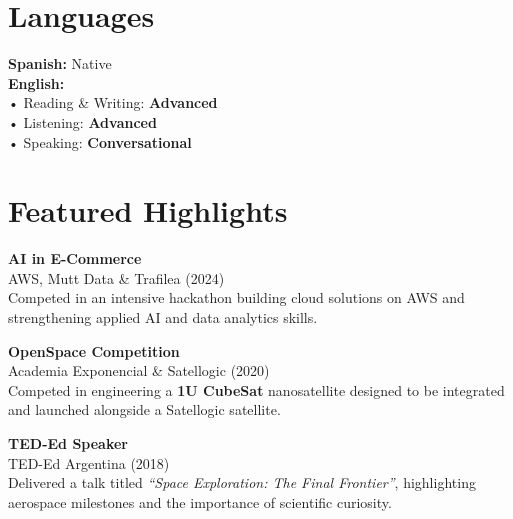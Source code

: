 \documentclass[10pt,a4paper]{article}
\newcommand{\sideitem}[3]{
  {\small\bfseries\color{darktext}#1}\\[1pt]
  {\footnotesize\color{primary}#2} {\footnotesize\color{mutedtext}(#3)}\\[1.5pt]
}
\begin{document}
\begin{minipage}[t]{6.3cm}
\section{Languages}
{\footnotesize\color{darktext}
\textbf{Spanish:} Native\\[2.5pt]
\textbf{English:}\\
\hspace*{0.3em}• Reading \& Writing: \textbf{Advanced}\\
\hspace*{0.3em}• Listening: \textbf{Advanced}\\
\hspace*{0.3em}• Speaking: \textbf{Conversational}
}

\section{Featured Highlights}

\sideitem{AI in E-Commerce}{AWS, Mutt Data \& Trafilea}{2024}
{\footnotesize\color{mutedtext}Competed in an intensive hackathon building cloud solutions on AWS and strengthening applied AI and data analytics skills.}\vspace{5pt}

\sideitem{OpenSpace Competition}{Academia Exponencial \& Satellogic}{2020}
{\footnotesize\color{mutedtext}Competed in engineering a \textbf{1U CubeSat} nanosatellite designed to be integrated and launched alongside a Satellogic satellite.}\vspace{5pt}

\sideitem{TED-Ed Speaker}{TED-Ed Argentina}{2018}
{\footnotesize\color{mutedtext}Delivered a talk titled \textit{``Space Exploration: The Final Frontier''}, highlighting aerospace milestones and the importance of scientific curiosity.}

\end{minipage}
\end{document}
